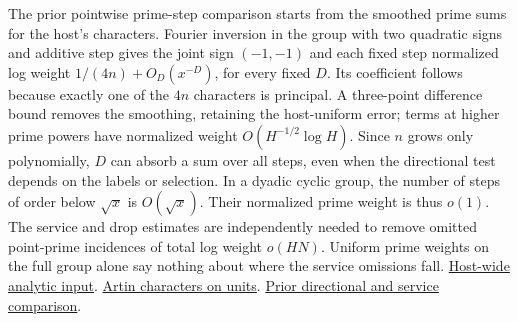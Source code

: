 \documentclass[12pt,letterpaper]{article}
\begin{document}
The prior pointwise prime-step comparison starts from the smoothed prime sums for the host's characters. Fourier inversion in the group with two quadratic signs and additive step gives the joint sign \((-1,-1)\) and each fixed step normalized log weight \(1/(4n)+O_D(x^{-D})\), for every fixed \(D\). Its coefficient follows because exactly one of the \(4n\) characters is principal. A three-point difference bound removes the smoothing, retaining the host-uniform error; terms at higher prime powers have normalized weight \(O(H^{-1/2}\log H)\). Since \(n\) grows only polynomially, \(D\) can absorb a sum over all steps, even when the directional test depends on the labels or selection. In a dyadic cyclic group, the number of steps of order below \(\sqrt{x}\) is \(O(\sqrt{x})\). Their normalized prime weight is thus \(o(1)\). The service and drop estimates are independently needed to remove omitted point-prime incidences of total log weight \(o(HN)\). Uniform prime weights on the full group alone say nothing about where the service omissions fall.
\href{https://github.com/nousentllc/riemann-hypothesis/blob/40e56bab026552e089d7afcfeff08d2defb9c005/src/Formalism/SharpRestriction/GlobalSchurBounds/Chosen.lean#L46-L51}{Host-wide analytic input}.
\href{https://github.com/nousentllc/riemann-hypothesis/blob/40e56bab026552e089d7afcfeff08d2defb9c005/src/Formalism/SharpRestriction/GlobalSchurBounds/Joints.lean#L855-L883}{Artin characters on units}.
\href{https://github.com/nousentllc/riemann-hypothesis/blob/ab18d856b6989f7bcb05e486ca720aa9016f3268/research/uriel/experiments/odd-position-study/evidence/FAMILY.md}{Prior directional and service comparison}.
\end{document}
